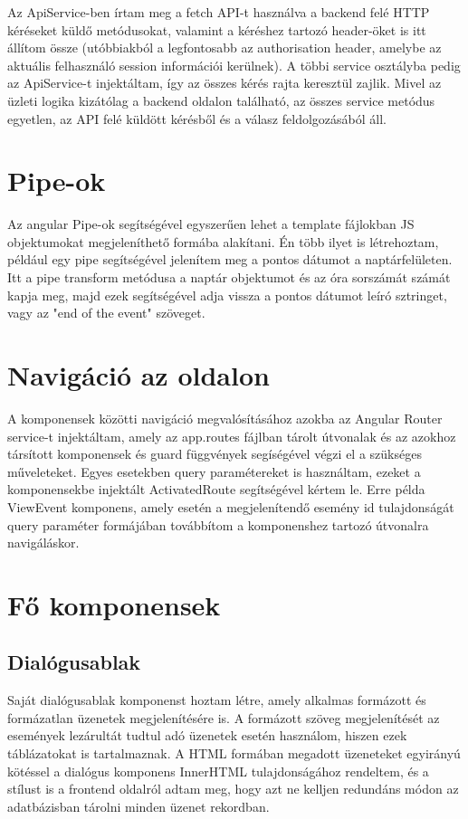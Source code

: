 \documentclass[a4paper,12pt]{report}
\theoremstyle{definition}
\theoremstyle{remark}
\begin{document}
Az ApiService-ben írtam meg a fetch API-t\cite{Fetchwebsite} használva a backend felé HTTP kéréseket küldő metódusokat, valamint a kéréshez tartozó header-öket is itt állítom össze (utóbbiakból a legfontosabb az authorisation header, amelybe az aktuális felhasználó session információi kerülnek). A többi service osztályba pedig az ApiService-t injektáltam, így az összes kérés rajta keresztül zajlik.  Mivel az üzleti logika kizátólag a backend oldalon található, az összes service metódus egyetlen, az API felé küldött kérésből és a válasz feldolgozásából áll.

\section{Pipe-ok}

Az angular Pipe-ok\cite{Pipewebsite} segítségével egyszerűen lehet a template fájlokban JS objektumokat megjeleníthető formába alakítani. Én több ilyet is létrehoztam, például egy pipe segítségével jelenítem meg a pontos dátumot a naptárfelületen. Itt a pipe transform metódusa a naptár objektumot és az óra sorszámát számát kapja meg, majd ezek segítségével adja vissza a pontos dátumot leíró sztringet, vagy az "end of the event" szöveget.

\section{Navigáció az oldalon}

A komponensek közötti navigáció megvalósításához azokba az Angular Router service-t\cite{Routerwebsite} injektáltam, amely az app.routes fájlban tárolt útvonalak és az azokhoz társított komponensek és guard függvények segíségével végzi el a szükséges műveleteket. Egyes esetekben query paramétereket is használtam, ezeket a komponensekbe injektált ActivatedRoute segítségével kértem le. Erre példa ViewEvent komponens, amely esetén a megjelenítendő esemény id tulajdonságát query paraméter formájában továbbítom a komponenshez tartozó útvonalra navigáláskor.

\section{Fő komponensek}

	\subsection{Dialógusablak}

Saját dialógusablak komponenst hoztam létre, amely alkalmas formázott és formázatlan üzenetek megjelenítésére is. A formázott szöveg megjelenítését az események lezárultát tudtul adó üzenetek esetén használom, hiszen ezek táblázatokat is tartalmaznak.  A HTML formában megadott üzeneteket egyirányú kötéssel a dialógus komponens InnerHTML tulajdonságához rendeltem, és a stílust is a frontend oldalról adtam meg, hogy azt ne kelljen redundáns módon az adatbázisban tárolni minden üzenet rekordban.
\end{document}
